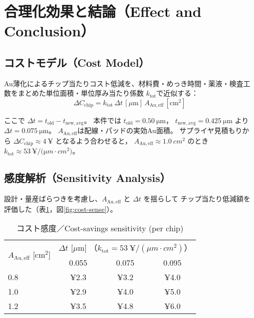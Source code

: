 \documentclass[conference]{IEEEtran}
\begin{document}
\section{合理化効果と結論（Effect and Conclusion）}

\subsection{コストモデル（Cost Model）}
Au薄化によるチップ当たりコスト低減を、材料費・めっき時間・薬液・検査工数をまとめた単位面積・単位厚み当たり係数
$k_{\mathrm{tot}}$で近似する：
\begin{equation}
  \Delta C_{\mathrm{chip}}
  = k_{\mathrm{tot}}\,
    \Delta t\,[\mu\mathrm{m}]\,
    A_{\mathrm{Au,eff}}\,[\mathrm{cm}^2]
\end{equation}

ここで $\Delta t=t_{\mathrm{old}}-t_{\mathrm{new,avg}}$。
本件では $t_{\mathrm{old}}=\SI{0.50}{\micro\meter}$，
$t_{\mathrm{new,avg}}=\SI{0.425}{\micro\meter}$ より
$\Delta t=\SI{0.075}{\micro\meter}$。
$A_{\mathrm{Au,eff}}$は配線・パッドの実効Au面積。
サプライヤ見積もりから $\Delta C_{\mathrm{chip}}\approx\SI{4}{¥}$ となるよう合わせると，
$A_{\mathrm{Au,eff}}\approx\SI{1.0}{cm^2}$ のとき
$k_{\mathrm{tot}}\approx\SI{53}{¥/(\micro m\cdot cm^2)}$。

\subsection{感度解析（Sensitivity Analysis）}
設計・量産ばらつきを考慮し、$A_{\mathrm{Au,eff}}$ と $\Delta t$ を揺らして
チップ当たり低減額を評価した（表\ref{tab:cost-sense}，図\ref{fig:cost-sense}）。

\begin{table}[htbp]
  \centering
  \caption{コスト感度／Cost-savings sensitivity (per chip)}
  \label{tab:cost-sense}
  \begin{tabular}{@{}lccc@{}}
    \toprule
    \multirow{2}{*}{$A_{\mathrm{Au,eff}}$ [cm$^2$]} &
    \multicolumn{3}{c}{$\Delta t$ [$\mu$m] （$k_{\mathrm{tot}}=\SI{53}{¥/(\mu m\cdot cm^2)}$）}\\
    \cmidrule(l){2-4}
     & 0.055 & 0.075 & 0.095 \\
    \midrule
    0.8 & ¥2.3 & ¥3.2 & ¥4.0 \\
    1.0 & ¥2.9 & ¥4.0 & ¥5.0 \\
    1.2 & ¥3.5 & ¥4.8 & ¥6.0 \\
    \bottomrule
  \end{tabular}
\end{table}
\end{document}
